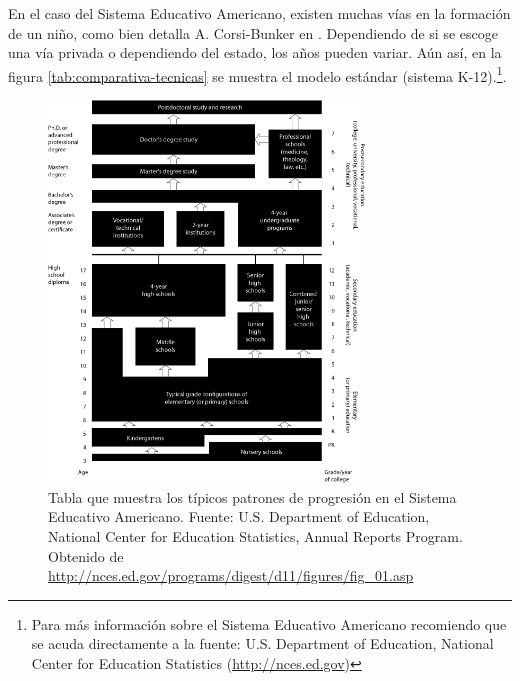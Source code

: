 En el caso del Sistema Educativo Americano, existen muchas vías en la formación de un niño, como bien detalla A. Corsi-Bunker en \cite{guide-education-us}. Dependiendo de si se escoge una vía privada o dependiendo del estado, los años pueden variar. Aún así, en la figura \ref{tab:comparativa-tecnicas} se muestra el modelo estándar (sistema K-12).\footnote{Para más información sobre el Sistema Educativo Americano recomiendo que se acuda directamente a la fuente: U.S. Department of Education, National Center for Education Statistics (\url{http://nces.ed.gov})}.

\begin{figure}[!ht]
	\begin{centering}
		\includegraphics[width=0.75\textwidth]{images/education-usa.png}
			\caption{Tabla que muestra los típicos patrones de progresión en el Sistema Educativo Americano. Fuente: U.S. Department of Education, National Center for Education Statistics, Annual Reports Program. Obtenido de \url{http://nces.ed.gov/programs/digest/d11/figures/fig_01.asp}}
				\label{fig:education-usa}
	\end{centering}
\end{figure}








